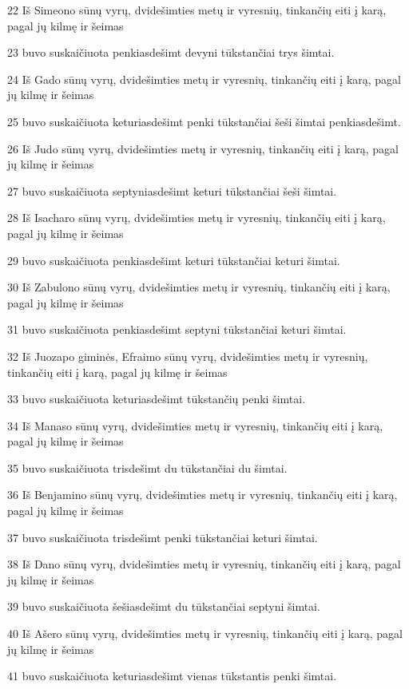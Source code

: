 \par 22 Iš Simeono sūnų vyrų, dvidešimties metų ir vyresnių, tinkančių eiti į karą, pagal jų kilmę ir šeimas 
\par 23 buvo suskaičiuota penkiasdešimt devyni tūkstančiai trys šimtai. 
\par 24 Iš Gado sūnų vyrų, dvidešimties metų ir vyresnių, tinkančių eiti į karą, pagal jų kilmę ir šeimas 
\par 25 buvo suskaičiuota keturiasdešimt penki tūkstančiai šeši šimtai penkiasdešimt. 
\par 26 Iš Judo sūnų vyrų, dvidešimties metų ir vyresnių, tinkančių eiti į karą, pagal jų kilmę ir šeimas 
\par 27 buvo suskaičiuota septyniasdešimt keturi tūkstančiai šeši šimtai. 
\par 28 Iš Isacharo sūnų vyrų, dvidešimties metų ir vyresnių, tinkančių eiti į karą, pagal jų kilmę ir šeimas 
\par 29 buvo suskaičiuota penkiasdešimt keturi tūkstančiai keturi šimtai. 
\par 30 Iš Zabulono sūnų vyrų, dvidešimties metų ir vyresnių, tinkančių eiti į karą, pagal jų kilmę ir šeimas 
\par 31 buvo suskaičiuota penkiasdešimt septyni tūkstančiai keturi šimtai. 
\par 32 Iš Juozapo giminės, Efraimo sūnų vyrų, dvidešimties metų ir vyresnių, tinkančių eiti į karą, pagal jų kilmę ir šeimas 
\par 33 buvo suskaičiuota keturiasdešimt tūkstančių penki šimtai. 
\par 34 Iš Manaso sūnų vyrų, dvidešimties metų ir vyresnių, tinkančių eiti į karą, pagal jų kilmę ir šeimas 
\par 35 buvo suskaičiuota trisdešimt du tūkstančiai du šimtai. 
\par 36 Iš Benjamino sūnų vyrų, dvidešimties metų ir vyresnių, tinkančių eiti į karą, pagal jų kilmę ir šeimas 
\par 37 buvo suskaičiuota trisdešimt penki tūkstančiai keturi šimtai. 
\par 38 Iš Dano sūnų vyrų, dvidešimties metų ir vyresnių, tinkančių eiti į karą, pagal jų kilmę ir šeimas 
\par 39 buvo suskaičiuota šešiasdešimt du tūkstančiai septyni šimtai. 
\par 40 Iš Ašero sūnų vyrų, dvidešimties metų ir vyresnių, tinkančių eiti į karą, pagal jų kilmę ir šeimas 
\par 41 buvo suskaičiuota keturiasdešimt vienas tūkstantis penki šimtai. 

